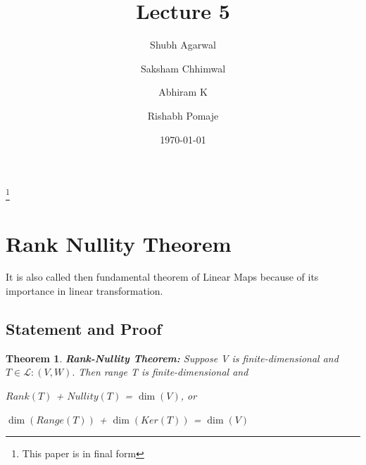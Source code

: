 \documentclass[a4paper,12pt,reqno,oneside]{amsart}
\newtheorem{theorem}{Theorem}
\theoremstyle{plain}
\numberwithin{equation}{section}
\begin{document}
\title[Rank Nullity Theorem and Matrix Representation]{Lecture 5}

\author{Shubh Agarwal}

 \author{Saksham Chhimwal}

 \author{Abhiram K}

\author{Rishabh Pomaje}
%

\thanks{This paper is in final form}
\date{\today}
\maketitle

\section{Rank Nullity Theorem}
It is also called then fundamental theorem of Linear Maps because of its importance
in linear transformation.

\subsection{Statement and Proof}

\begin{theorem}
	\textbf{Rank-Nullity Theorem:}
	Suppose V is finite-dimensional and $T\in\mathcal{L}:(V, W).$ Then range T is 
	finite-dimensional and 
	\begin{center}
		$Rank(T)$ + $Nullity(T)$ = $\dim(V)$, or
	\end{center}
	\begin{center}
		$\dim(Range(T))$ + $\dim(Ker(T))$ = $\dim(V)$
	\end{center}
\end{theorem}
\end{document}
